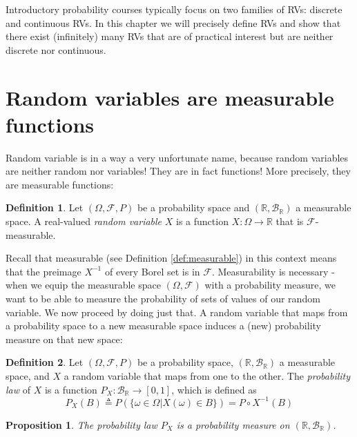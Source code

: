 \documentclass{book}
\theoremstyle{plain}%
\newtheorem{proposition}{Proposition}[section]
\theoremstyle{definition}
\newtheorem{definition}{Definition}[section]
\newlength{\arrow}
\begin{document}
Introductory probability courses typically focus on two families of RVs: discrete and continuous RVs. In this chapter we will precisely define RVs and show that there exist (infinitely) many RVs that are of practical interest but are neither discrete nor continuous.

\section{Random variables are measurable functions}

Random variable is in a way a very unfortunate name, because random variables are neither random nor variables! They are in fact functions! More precisely, they are measurable functions:

\begin{definition}
Let $(\Omega, \mathcal{F}, P)$ be a probability space and $(\mathbb{R}, \mathcal{B}_\mathbb{R})$ a measurable space. A real-valued \emph{random variable} $X$ is a function $X: \Omega \rightarrow \mathbb{R}$ that is $\mathcal{F}$-measurable.
\end{definition}

Recall that measurable (see Definition \ref{def:measurable}) in this context means that the preimage $X^{-1}$ of every Borel set is in $\mathcal{F}$. Measurability is necessary - when we equip the measurable space $(\Omega, \mathcal{F})$ with a probability measure, we want to be able to measure the probability of sets of values of our random variable. We now proceed by doing just that. A random variable that maps from a probability space to a new measurable space induces a (new) probability measure on that new space:

\begin{definition}
Let $(\Omega, \mathcal{F}, P)$ be a probability space, $(\mathbb{R}, \mathcal{B}_\mathbb{R})$ a measurable space, and $X$ a random variable that maps from one to the other. The \emph{probability law} of $X$ is a function $P_X: \mathcal{B}_\mathbb{R} \rightarrow [0,1]$, which is defined as $$P_X(B) \triangleq P(\{\omega \in \Omega | X(\omega) \in B\}) = P \circ X^{-1}(B)$$
\end{definition}

\begin{proposition}
The probability law $P_X$ is a probability measure on $(\mathbb{R},\mathcal{B}_\mathbb{R})$.
\end{proposition}
\end{document}
